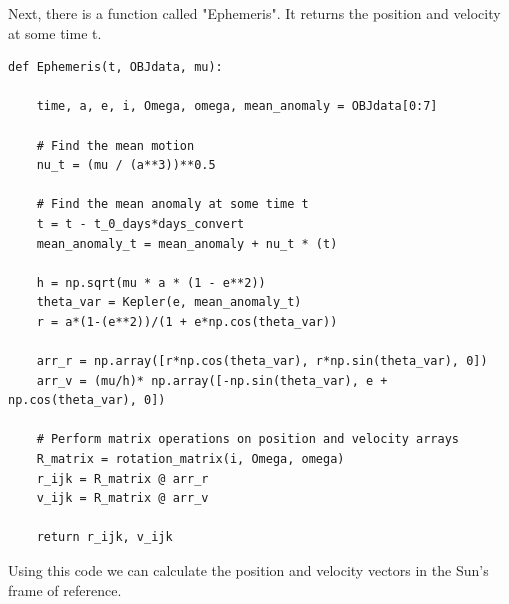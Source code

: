 \documentclass[12pt,twocolumn]{article}  %
\begin{document}
Next, there is a function called "Ephemeris". It returns the position and velocity at some time t.
\begin{lstlisting}
def Ephemeris(t, OBJdata, mu):

    time, a, e, i, Omega, omega, mean_anomaly = OBJdata[0:7]
        
    # Find the mean motion
    nu_t = (mu / (a**3))**0.5

    # Find the mean anomaly at some time t 
    t = t - t_0_days*days_convert
    mean_anomaly_t = mean_anomaly + nu_t * (t)

    h = np.sqrt(mu * a * (1 - e**2))
    theta_var = Kepler(e, mean_anomaly_t)
    r = a*(1-(e**2))/(1 + e*np.cos(theta_var))

    arr_r = np.array([r*np.cos(theta_var), r*np.sin(theta_var), 0])
    arr_v = (mu/h)* np.array([-np.sin(theta_var), e + np.cos(theta_var), 0])

    # Perform matrix operations on position and velocity arrays
    R_matrix = rotation_matrix(i, Omega, omega)
    r_ijk = R_matrix @ arr_r
    v_ijk = R_matrix @ arr_v

    return r_ijk, v_ijk
\end{lstlisting}

\noindent Using this code we can calculate the position and velocity vectors in the Sun's frame of reference. 
\end{document}
